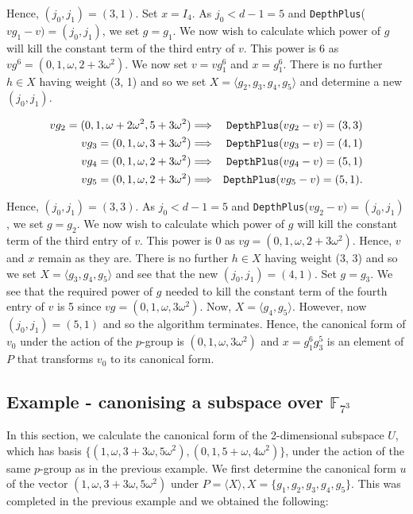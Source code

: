 \documentclass[12pt]{report}
\begin{document}
Hence, $(j_0, j_1) = (3, 1)$. Set $x = I_4$. As $j_0 < d - 1 = 5$ and {\tt DepthPlus}($v g_1 - v) = (j_0, j_1)$, we set $g = g_1$. We now wish to calculate which power of $g$ will kill the constant term of the third entry of $v$. This power is 6 as $vg^6 = (0, 1, \omega, 2+3\omega^2)$. We now set $v = v g_1^6$ and $x = g_1^6$. There is no further $h \in X$ having weight (3, 1) and so we set $X = \langle g_2, g_3, g_4, g_5 \rangle$ and determine a new $(j_0, j_1)$.

\begin{eqnarray*}
vg_2 = (0, 1, \omega + 2\omega^2, 5+3\omega^2) & \Longrightarrow & {\tt DepthPlus}(v g_2 - v) = (3, 3) \\
vg_3 = (0, 1, \omega, 3+3\omega^2) & \Longrightarrow & {\tt DepthPlus}(v g_3 - v) = (4, 1) \\
vg_4 = (0, 1, \omega, 2+3\omega^2) & \Longrightarrow & {\tt DepthPlus}(v g_4 - v) = (5, 1) \\
vg_5 = (0, 1, \omega, 2+3\omega^2) & \Longrightarrow & {\tt DepthPlus}(v g_5 - v) = (5, 1).
\end{eqnarray*}

Hence, $(j_0, j_1) = (3, 3)$. As $j_0 < d - 1 = 5$ and {\tt DepthPlus}($v g_2 - v) = (j_0, j_1)$, we set $g = g_2$. We now wish to calculate which power of $g$ will kill the constant term of the third entry of $v$. This power is 0 as $vg = (0, 1, \omega, 2+3\omega^2)$. Hence, $v$ and $x$ remain as they are. There is no further $h \in X$ having weight (3, 3) and so we set $X = \langle g_3, g_4, g_5 \rangle$ and see that the new $(j_0, j_1) = (4, 1)$. Set $g = g_3$. We see that the required power of $g$ needed to kill the constant term of the fourth entry of $v$ is 5 since $vg = (0, 1, \omega, 3\omega^2)$. Now, $X = \langle g_4, g_5 \rangle$. However, now $(j_0, j_1) = (5, 1)$ and so the algorithm terminates. Hence, the canonical form of $v_0$ under the action of the $p$-group is $(0, 1, \omega, 3\omega^2)$ and $x = g_1^6 g_3^5$ is an element of $P$ that transforms $v_0$ to its canonical form.

\subsection{Example - canonising a subspace over $\mathbb{F}_{7^3}$}

In this section, we calculate the canonical form of the 2-dimensional subspace $U$, which has basis $\{ (1, \omega, 3 + 3 \omega, 5 \omega^2), (0, 1, 5+\omega, 4\omega^2) \}$, under the action of the same $p$-group as in the previous example. We first determine the canonical form $u$ of the vector $(1, \omega, 3 + 3 \omega, 5 \omega^2)$ under $P = \langle X \rangle, X = \{g_1, g_2, g_3, g_4, g_5\}$. This was completed in the previous example and we obtained the following:
\end{document}
